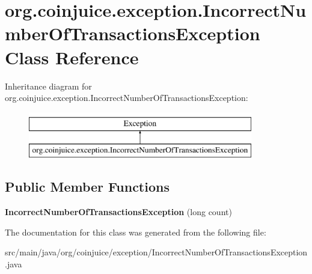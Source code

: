 \hypertarget{classorg_1_1coinjuice_1_1exception_1_1_incorrect_number_of_transactions_exception}{\section{org.\-coinjuice.\-exception.\-Incorrect\-Number\-Of\-Transactions\-Exception Class Reference}
\label{classorg_1_1coinjuice_1_1exception_1_1_incorrect_number_of_transactions_exception}
}
Inheritance diagram for org.\-coinjuice.\-exception.\-Incorrect\-Number\-Of\-Transactions\-Exception\-:\begin{figure}[H]
\begin{center}
\leavevmode
\includegraphics[height=2.000000cm]{classorg_1_1coinjuice_1_1exception_1_1_incorrect_number_of_transactions_exception}
\end{center}
\end{figure}
\subsection*{Public Member Functions}
\begin{DoxyCompactItemize}
\item 
\hypertarget{classorg_1_1coinjuice_1_1exception_1_1_incorrect_number_of_transactions_exception_a71092b68741446f2979abef22b4f8f78}{{\bfseries Incorrect\-Number\-Of\-Transactions\-Exception} (long count)}\label{classorg_1_1coinjuice_1_1exception_1_1_incorrect_number_of_transactions_exception_a71092b68741446f2979abef22b4f8f78}

\end{DoxyCompactItemize}


The documentation for this class was generated from the following file\-:\begin{DoxyCompactItemize}
\item 
src/main/java/org/coinjuice/exception/Incorrect\-Number\-Of\-Transactions\-Exception.\-java\end{DoxyCompactItemize}
